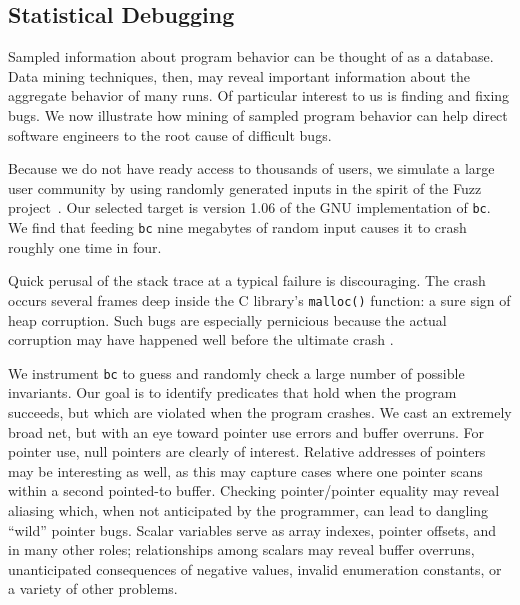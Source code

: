 \subsection{Statistical Debugging}
\label{sec:debug}

Sampled information about program behavior can be thought of as a
database.  Data mining techniques, then, may reveal important
information about the aggregate behavior of many runs.  Of particular
interest to us is finding and fixing bugs.  We now illustrate how
mining of sampled program behavior can help direct software engineers
to the root cause of difficult bugs.

Because we do not have ready access to thousands of users, we simulate
a large user community by using randomly generated inputs in the
spirit of the Fuzz project~\cite{MKLMMNS95}.  Our selected target is
version 1.06 of the GNU implementation of \texttt{bc}.  We find that
feeding \texttt{bc} nine megabytes of random input causes it to crash
roughly one time in four.  

Quick perusal of the stack trace at a typical failure is discouraging.
The crash occurs several frames deep inside the C library's
\texttt{malloc()} function: a sure sign of heap corruption.  Such bugs
are especially pernicious because the actual corruption may have
happened well before the ultimate crash \cite{Eisenstadt1993b}.

We instrument \texttt{bc} to guess and randomly check a large number
of possible invariants.  Our goal is to identify predicates that hold
when the program succeeds, but which are violated when the program
crashes.  We cast an extremely broad net, but with an eye toward
pointer use errors and buffer overruns.  For pointer use, null
pointers are clearly of interest.  Relative addresses of pointers may be
interesting as well, as this may capture cases where one pointer scans
within a second pointed-to buffer.  Checking pointer/pointer equality
may reveal aliasing which, when not anticipated by the programmer, can
lead to dangling ``wild'' pointer bugs.  Scalar variables serve as
array indexes, pointer offsets, and in many other roles; relationships
among scalars may reveal buffer overruns, unanticipated consequences
of negative values, invalid enumeration constants, or a variety of
other problems.

